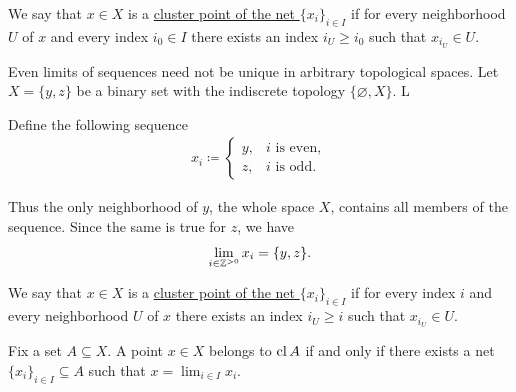 \begin{definition}\label{def:net_cluster_point}\cite[50]{Engelking1989}
  We say that $x \in X$ is a \ul{cluster point of the net $\{ x_i \}_{i \in I}$} if for every neighborhood $U$ of $x$ and every index $i_0 \in I$ there exists an index $i_U \geq i_0$ such that $x_{i_U} \in U$.
\end{definition}

\begin{example}\label{ex:multiple_limit_points_of_net}
  Even limits of sequences need not be unique in arbitrary topological spaces. Let $X = \{ y, z \}$ be a binary set with the indiscrete topology $\{ \varnothing, X \}$. L

  Define the following sequence
  \begin{align*}
    x_i \coloneqq \begin{cases}
      y, &i \text{ is even}, \\
      z, &i \text{ is odd}.
    \end{cases}
  \end{align*}

  Thus the only neighborhood of $y$, the whole space $X$, contains all members of the sequence. Since the same is true for $z$, we have
  \begin{align*}
    \lim_{i \in \mathbb Z^{>0}} x_i = \{ y, z \}.
  \end{align*}
\end{example}

\begin{definition}\label{def:net_cluster_point}\cite[50]{Engelking1989}
  We say that $x \in X$ is a \ul{cluster point of the net $\{ x_i \}_{i \in I}$} if for every index $i$ and every neighborhood $U$ of $x$ there exists an index $i_U \geq i$ such that $x_{i_U} \in U$.
\end{definition}

\begin{proposition}\label{thm:limit_point_iff_in_closure}\cite[proposition 1.6.3]{Engelking1989}
  Fix a set $A \subseteq X$. A point $x \in X$ belongs to $\operatorname{cl}{A}$ if and only if there exists a net $\{ x_i \}_{i \in I} \subseteq A$ such that $x = \lim_{i \in I} x_i$.
\end{proposition}
